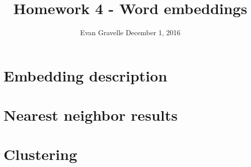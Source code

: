 \documentclass[letterpaper,10pt,onecolumn]{IEEEconf}
\begin{document}
\title{Homework 4 - Word embeddings}
\author{Evan Gravelle \quad \quad December 1, 2016}
\maketitle

\section{Embedding description}



\section{Nearest neighbor results}



\section{Clustering}
\end{document}
